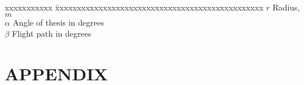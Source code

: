 \documentclass[BTech]{iitmdiss}
\begin{document}
\begin{singlespace}
\begin{tabbing}
xxxxxxxxxxx \= xxxxxxxxxxxxxxxxxxxxxxxxxxxxxxxxxxxxxxxxxxxxxxxx \kill
\textbf{$r$}  \> Radius, $m$ \\
\textbf{$\alpha$}  \> Angle of thesis in degrees \\
\textbf{$\beta$}   \> Flight path in degrees \\
\end{tabbing}
\end{singlespace}

\pagebreak


\clearpage









\appendix

\chapter{APPENDIX}


\begin{singlespace}
  
\end{singlespace}
\end{document}
